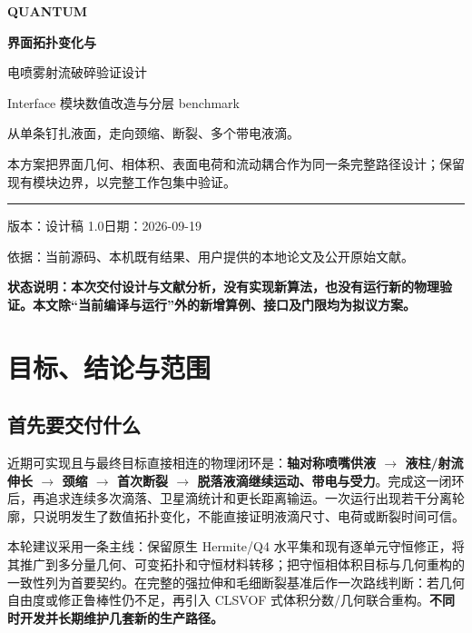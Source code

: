 \documentclass[11pt,a4paper]{article}
\begin{document}
\begin{titlepage}
\thispagestyle{empty}
\vspace*{20mm}
{\sffamily\Huge\bfseries\color{ink} QUANTUM\par}
\vspace{10mm}
{\LARGE\bfseries 界面拓扑变化与\par 电喷雾射流破碎验证设计\par}
\vspace{8mm}
{\Large Interface 模块数值改造与分层 benchmark\par}
\vspace{14mm}
\noindent 从单条钉扎液面，走向颈缩、断裂、多个带电液滴。\par
\medskip
\noindent 本方案把界面几何、相体积、表面电荷和流动耦合作为同一条完整路径设计；保留现有模块边界，以完整工作包集中验证。\par
\vfill
\noindent\rule{\linewidth}{0.5pt}\par
\noindent 版本：设计稿 1.0\qquad 日期：2026-09-19\par
\noindent 依据：当前源码、本机既有结果、用户提供的本地论文及公开原始文献。\par
\noindent \textbf{状态说明：本次交付设计与文献分析，没有实现新算法，也没有运行新的物理验证。本文除“当前编译与运行”外的新增算例、接口及门限均为拟议方案。}\par
\end{titlepage}
{\small\setlength{\parskip}{0pt}\tableofcontents}
\clearpage

\section{目标、结论与范围}
\subsection{首先要交付什么}
近期可实现且与最终目标直接相连的物理闭环是：\textbf{轴对称喷嘴供液 $\rightarrow$ 液柱/射流伸长 $\rightarrow$ 颈缩 $\rightarrow$ 首次断裂 $\rightarrow$ 脱落液滴继续运动、带电与受力}。完成这一闭环后，再追求连续多次滴落、卫星滴统计和更长距离输运。一次运行出现若干分离轮廓，只说明发生了数值拓扑变化，不能直接证明液滴尺寸、电荷或断裂时间可信。

本轮建议采用一条主线：保留原生 Hermite/Q4 水平集和现有逐单元守恒修正，将其推广到多分量几何、可变拓扑和守恒材料转移；把守恒相体积目标与几何重构的一致性列为首要契约。在完整的强拉伸和毛细断裂基准后作一次路线判断：若几何自由度或修正鲁棒性仍不足，再引入 CLSVOF 式体积分数/几何联合重构。\textbf{不同时开发并长期维护几套新的生产路径。}
\end{document}
